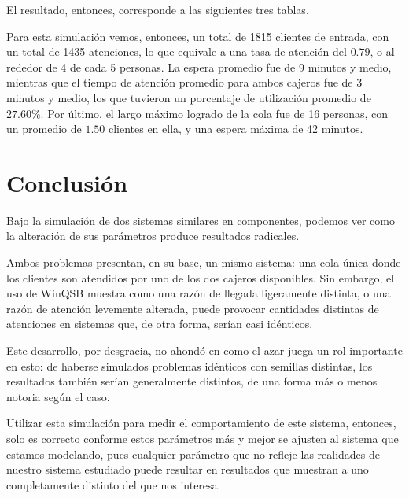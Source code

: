 \clearpage
El resultado, entonces, corresponde a las siguientes tres tablas.

Para esta simulación vemos, entonces, un total de 1815 clientes de entrada, con un total de 1435 atenciones, lo que equivale a una tasa de atención del $0.79$, o al rededor de 4 de cada 5 personas. La espera promedio fue de 9 minutos y medio, mientras que el tiempo de atención promedio para ambos cajeros fue de 3 minutos y medio, los que tuvieron un porcentaje de utilización promedio de $27.60\%$. Por último, el largo máximo logrado de la cola fue de 16 personas, con un promedio de $1.50$ clientes en ella, y una espera máxima de 42 minutos.

\section{Conclusión}
Bajo la simulación de dos sistemas similares en componentes, podemos ver como la alteración de sus parámetros produce resultados radicales.

Ambos problemas presentan, en su base, un mismo sistema: una cola única donde los clientes son atendidos por uno de los dos cajeros disponibles. Sin embargo, el uso de WinQSB muestra como una razón de llegada ligeramente distinta, o una razón de atención levemente alterada, puede provocar cantidades distintas de atenciones en sistemas que, de otra forma, serían casi idénticos.

Este desarrollo, por desgracia, no ahondó en como el azar juega un rol importante en esto: de haberse simulados problemas idénticos con semillas distintas, los resultados también serían generalmente distintos, de una forma más o menos notoria según el caso.

Utilizar esta simulación para medir el comportamiento de este sistema, entonces, solo es correcto conforme estos parámetros más y mejor se ajusten al sistema que estamos modelando, pues cualquier parámetro que no refleje las realidades de nuestro sistema estudiado puede resultar en resultados que muestran a uno completamente distinto del que nos interesa.

